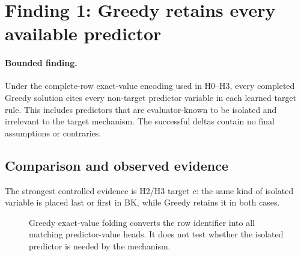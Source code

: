 \documentclass[11pt]{article}
\newcommand{\finding}{\paragraph{Bounded finding.}}
\begin{document}
\section{Finding 1: Greedy retains every available predictor}

\finding
Under the complete-row exact-value encoding used in H0--H3, every completed
Greedy solution cites every non-target predictor variable in each learned
target rule. This includes predictors that are evaluator-known to be isolated
and irrelevant to the target mechanism. The successful deltas contain no final
assumptions or contraries.

\subsection{Comparison and observed evidence}

The strongest controlled evidence is H2/H3 target \(c\): the same kind of
isolated variable is placed last or first in BK, while Greedy retains it in
both cases.

\begin{figure}[ht]
\centering
{}
\caption{Greedy exact-value folding converts the row identifier into all
matching predictor-value heads. It does not test whether the isolated
predictor is needed by the mechanism.}
\label{fig:greedy-full}
\end{figure}
\end{document}
